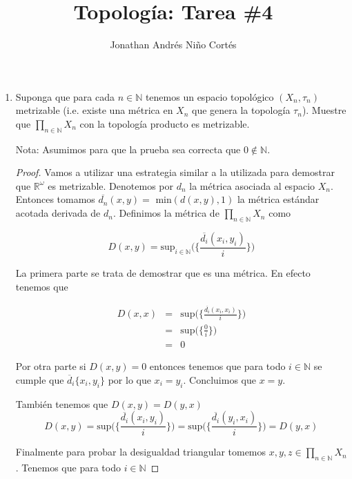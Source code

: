 \documentclass[letter,twoside,12pt]{article}
\title{Topología: Tarea \#4}
\author{Jonathan Andrés Niño Cortés}
\begin{document}
\maketitle
\begin{enumerate}
\item Suponga que para cada $ n \in \mathbb{N} $ tenemos un espacio topológico $ (X_n,\tau_n) $ metrizable (i.e. existe una métrica en $ X_n $ que genera la topología $ \tau_n $). Muestre que $ \prod_{n \in \mathbb{N}} X_n$ con la topología producto es metrizable.

Nota: Asumimos para que la prueba sea correcta que $ 0 \not \in \mathbb{N} $.
\begin{proof}
Vamos a utilizar una estrategia similar a la utilizada para demostrar que $ \mathbb{R}^{\omega} $ es metrizable. Denotemos por $ d_n $ la métrica asociada al espacio $ X_n $. Entonces tomamos $ \overline{d_n}(x,y) = \text{ min}(d(x,y),1)$ la métrica estándar acotada derivada de $ d_n $. Definimos la métrica de $ \prod_{n \in \mathbb{N}} X_n$ como 

\begin{equation}
D(x,y)=\text{sup}_{i \in \mathbb{N}}\Big(\Big\{\frac{\overline{d_i}(x_i,y_i)}{i}\Big\}\Big) \nonumber
\end{equation}

La primera parte se trata de demostrar que es una métrica. En efecto tenemos que

\begin{eqnarray}
D(x,x)&=&\text{sup}\Big(\Big\{\frac{\overline{d_i}(x_i,x_i)}{i}\Big\}\Big) \nonumber
\\&=&\text{sup}\Big(\Big\{\frac{0}{i}\Big\}\Big) \nonumber
\\&=&0 \nonumber
\end{eqnarray}

Por otra parte si $ D(x,y) = 0$ entonces tenemos que para todo $ i \in \mathbb{N} $ se cumple que $ \overline{d}_i\{x_i,y_i\} $ por lo que $ x_i = y_i $. Concluimos que $ x = y $.

También tenemos que $ D(x,y) = D(y,x)$
\begin{equation}
D(x,y)=\text{sup}\Big(\Big\{\frac{\overline{d_i}(x_i,y_i)}{i}\Big\}\Big) = \text{sup}\Big(\Big\{\frac{\overline{d_i}(y_i,x_i)}{i}\Big\}\Big) = D(y,x)\nonumber
\end{equation}

Finalmente para probar la desigualdad triangular tomemos $x,y,z \in \prod_{n \in \mathbb{N}}X_n$. Tenemos que para todo $ i \in \mathbb{N} $


\end{proof}
\end{enumerate}
\end{document}
